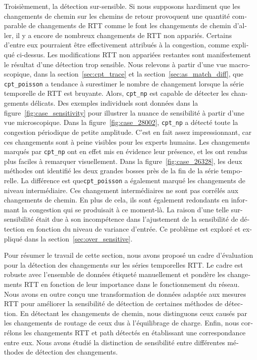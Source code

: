 \begin{otherlanguage}{french}
Troisièmement, la détection sur-sensible.
Si nous supposons hardiment que les changements de chemin sur les chemins de retour provoquent une quantité comparable de changements de RTT comme le font les changements de chemin d'aller, il y a encore de nombreux changements de RTT non appariés.
Certains d'entre eux pourraient être effectivement attribués à la congestion, comme expliqué ci-dessus.
Les modifications RTT non appariées restantes sont manifestement le résultat d'une détection trop sensible.
Nous relevons à partir d'une vue macroscopique, dans la section~\ref{sec:cpt_trace} et la section~\ref {sec:as_match_diff}, 
que \texttt{cpt\_poisson} a tendance à surestimer le nombre de changement lorsque la série temporelle de RTT est bruyante.
Alors, \texttt{cpt\_np} est capable de détecter les changements délicats.
Des exemples individuels sont données dans la figure~\ref{fig:case_sensitivity} pour illustrer 
la nuance de sensibilité à partir d'une vue microscopique.
Dans la figure~\ref{fig:case_28002}, \texttt{cpt\_np} a détecté toute la congestion périodique de petite amplitude.
C'est en fait assez impressionnant, car ces changements sont à peine visibles pour les experts humains.
Les changements marqués par \texttt{cpt\_np} ont en effet mis en évidence leur présence, et les ont rendus plus faciles à remarquer visuellement.
Dans la figure~\ref{fig:case_26328}, les deux méthodes ont identifié les deux grandes bosses près de la fin de la série temporelle.
La différence est que\texttt{cpt\_poisson} a également marqué les changements de niveau intermédiaire.
Ces changement intermédiaires ne sont pas corrélés aux changements de chemin.
En plus de cela, ils sont également redondants en informant la congestion qui se produisait à ce moment-là.
La raison d'une telle sur-sensibilité était due à son incompétence dans l'ajustement de la sensibilité de détection en fonction du niveau de variance d'entrée. 
Ce problème est exploré et expliqué dans la section~\ref{sec:over_sensitive}.

Pour résumer le travail de cette section, nous avons proposé un cadre d'évaluation pour la détection des changements sur les séries temporelles RTT.
Le cadre est robuste avec l'ensemble de données étiqueté manuellement et pondère les changements RTT en fonction de leur importance dans le fonctionnement du réseau.
Nous avons en outre conçu une transformation de données adaptée aux mesures RTT pour améliorer la sensibilité de détection de certaines méthodes de détection.
En détectant les changements de chemin, nous distinguons ceux causés par les changements de routage de ceux dus à l'équilibrage de charge.
Enfin, nous corrélons les changements RTT et path détectés en établissant une correspondance entre eux.
Nous avons étudié la distinction de sensibilité entre différentes méthodes de détection des changements.


\end{otherlanguage}
